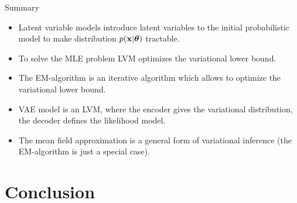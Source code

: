 \begin{frame}{Summary}

\begin{itemize}
	\item Latent variable models introduce latent variables to the initial probabilistic model to make distribution $p(\mathbf{x} | \boldsymbol{\theta})$ tractable.
	\item To solve the MLE problem LVM optimizes the variational lower bound.
	\item The EM-algorithm is an iterative algorithm which allows to optimize the variational lower bound.
	\item VAE model is an LVM, where the encoder gives the variational distribution, the decoder defines the likelihood model.
	\item The mean field approximation is a general form of variational inference (the EM-algorithm is just a special case).
\end{itemize}
\end{frame}
\section{Conclusion}

 